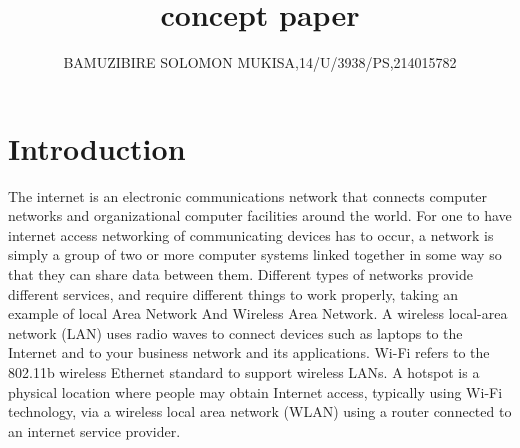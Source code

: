 \documentclass[10]{article}
\begin{document}
\title{concept paper}

\maketitle
\author{BAMUZIBIRE SOLOMON MUKISA,14/U/3938/PS,214015782}
\section{Introduction}
The internet is an electronic communications network that connects computer networks and organizational computer facilities around the world. For one to have internet access networking of communicating devices has to occur,  a network is simply a group of two or more computer systems linked together in some way so that they can share data between them. Different types of networks provide different services, and require different things to work properly, taking an example of local Area Network And Wireless Area Network.
A wireless local-area network (LAN) uses radio waves to connect devices such as laptops to the Internet and to your business network and its applications.
Wi-Fi refers to the 802.11b wireless Ethernet standard to support wireless LANs.
A hotspot is a physical location where people may obtain Internet access, typically using Wi-Fi technology, via a wireless local area network (WLAN) using a router connected to an internet service provider.
\end{document}
